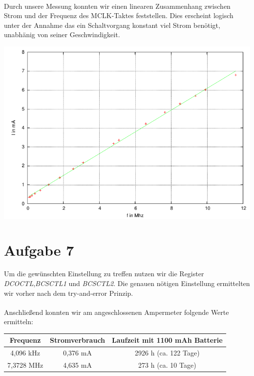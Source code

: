\paragraph*{}
Durch unsere Messung konnten wir einen linearen Zusammenhang zwischen Strom und der Frequenz des MCLK-Taktes feststellen. Dies erscheint logisch unter der Annahme das ein Schaltvorgang konstant viel Strom benötigt, unabhänig von seiner Geschwindigkeit.

\includegraphics[width=\textwidth]{graphs/vfgraph.pdf}


\section{Aufgabe 7}

\paragraph*{}
Um die gewünschten Einstellung zu treffen nutzen wir die Register {\em DCOCTL},{\em BCSCTL1} und {\em BCSCTL2}. Die genauen nötigen Einstellung ermittelten wir vorher nach dem try-and-error Prinzip.



\paragraph*{}
Anschließend konnten wir am angeschlossenen Ampermeter folgende Werte ermitteln: \\

\begin{tabular}{ c | c | c }\hline \hline
Frequenz & Stromverbrauch & Laufzeit mit 1100 mAh Batterie \\ \hline
4,096 kHz & 0,376 mA & 2926 h (ca. 122 Tage) \\ \hline
7,3728 MHz & 4,635 mA & 273 h (ca. 10 Tage) \\ \hline
\end{tabular}

